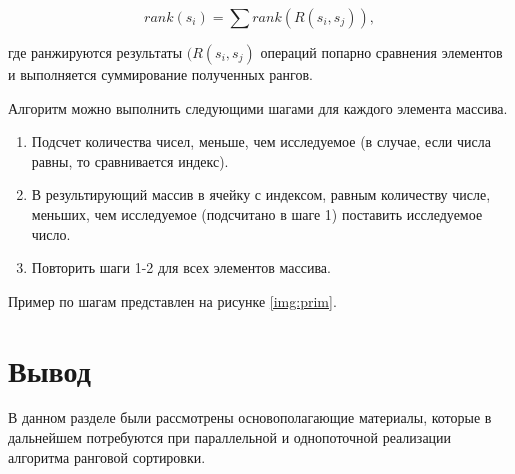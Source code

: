  \begin{equation}
 	\label{for:selection_best}
 	rank(s_{i}) = \sum rank(R(s_{i}, s_{j})),
 \end{equation}

где ранжируются результаты $(R(s_{i}, s_{j})$ операций попарно сравнения элементов и выполняется суммирование полученных рангов.

Алгоритм можно выполнить следующими шагами для каждого элемента массива.
\begin{enumerate}
	\item Подсчет количества чисел, меньше, чем исследуемое (в случае, если числа равны, то сравнивается индекс).
	\item В результирующий массив в ячейку с индексом, равным количеству числе, меньших, чем исследуемое (подсчитано в шаге 1) поставить исследуемое число.
	\item Повторить шаги 1-2 для всех элементов массива.
\end{enumerate}

Пример по шагам представлен на рисунке \ref{img:prim}.

\clearpage

\section*{Вывод}
В данном разделе были рассмотрены основополагающие материалы, которые в дальнейшем потребуются при параллельной и однопоточной реализации алгоритма ранговой сортировки.

